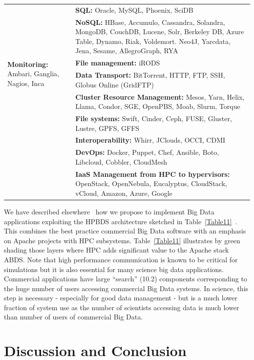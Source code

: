 \documentclass{acm_proc_article-sp}
\begin{document}
\begin{table}[H]
\begin{tabular}{|p{2cm}|p{6cm}|}
&\textbf{SQL:} Oracle, MySQL, Phoenix, SciDB\\ \cline{2-2} 
&\textbf{NoSQL:} HBase, Accumulo, Cassandra, Solandra, MongoDB, CouchDB, Lucene, Solr, Berkeley DB, Azure Table, Dynamo, Riak, Voldemort. Neo4J, Yarcdata, Jena, Sesame, AllegroGraph, RYA\\ \hline
\multirow{2}{2cm}{\textbf{Monitoring:} Ambari, Ganglia, Nagios, Inca}
&\textbf{File management:} iRODS\\ \cline{2-2} 
&\textbf{Data Transport:} BitTorrent, HTTP, FTP, SSH, Globus Online (GridFTP)\\ \cline{2-2} 
&\textbf{Cluster Resource Management:} Mesos, Yarn, Helix, Llama, Condor, SGE, OpenPBS, Moab, Slurm, Torque\\ \cline{2-2} 
&\textbf{File systems:} Swift, Cinder, Ceph, FUSE, Gluster, Lustre, GPFS, GFFS\\ \cline{2-2} 
&\textbf{Interoperability:} Whirr, JClouds, OCCI, CDMI\\ \cline{2-2} 
&\textbf{DevOps:} Docker, Puppet, Chef, Ansible, Boto, Libcloud, Cobbler, CloudMesh\\ \cline{2-2} 
&\textbf{IaaS Management from HPC to hypervisors:} OpenStack, OpenNebula, Eucalyptus, CloudStack, vCloud, Amazon, Azure, Google\\ \hline
\end{tabular}

\end{table}


We have described elsewhere~\cite{b30,b14,b27} how we propose to implement Big Data applications exploiting the HPBDS architecture sketched in Table~\ref{Table11}~\cite{b2}. This combines the best practice commercial Big Data software with an emphasis on Apache projects with HPC subsystems. Table~\ref{Table11} illustrates by green shading those layers where HPC adds significant value to the Apache stack ABDS. Note that high performance communication is known to be critical for simulations but it is also essential for many science big data applications. Commercial applications have large ``search'' (10.2) components corresponding to the huge number of users accessing commercial Big Data systems. In science, this step is necessary - especially for good data management - but is a much lower fraction of system use as the number of scientists accessing data is much lower than number of users of commercial Big Data.

\section{Discussion and Conclusion}
\end{document}
